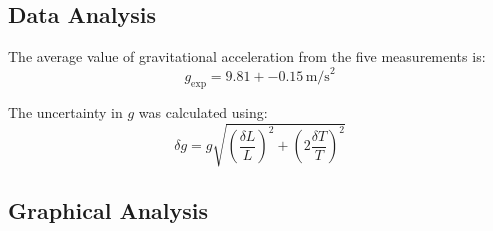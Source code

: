 \documentclass[11pt,a4paper]{article}
\newcommand{\SI}[2]{#1\,#2}
\begin{document}
\subsection{Data Analysis}


The average value of gravitational acceleration from the five measurements is:
\begin{equation}
    \label{eq:result}
    g_{\text{exp}} = \SI{9.81 +- 0.15}{\text{m/s}^2}
\end{equation}

The uncertainty in $g$ was calculated using:
\begin{equation}
    \delta g = g \sqrt{\left(\frac{\delta L}{L}\right)^2 + \left(2\frac{\delta T}{T}\right)^2}
\end{equation}

\subsection{Graphical Analysis}


\end{document}
